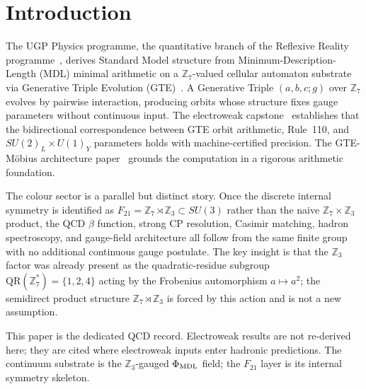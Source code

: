 \documentclass[11pt]{article}
\theoremstyle{remark}
\newcommand{\ZS}{\mathbb{Z}_7}
\newcommand{\ZZ}{\mathbb{Z}}
\newcommand{\phimdl}{\Phi_{\rm MDL}}
\newcommand{\Ftwentyone}{F_{21}}
\begin{document}
\section{Introduction}
\label{sec:intro}

The UGP Physics programme, the quantitative branch of the Reflexive Reality programme~\cite{SpivackResearchProgrammes}, derives Standard Model
structure from Minimum-Description-Length (MDL) minimal arithmetic on a $\ZS$-valued cellular automaton
substrate via Generative Triple Evolution (GTE)~\cite{SpivackCompUniversality}.
A Generative Triple $(a,b,c;g)$ over $\ZZ_7$ evolves by pairwise interaction,
producing orbits whose structure fixes gauge parameters without continuous input.
The electroweak capstone~\cite{SpivackGTEUnification} establishes that the
bidirectional correspondence between GTE orbit arithmetic, Rule~110, and
$SU(2)_L \times U(1)_Y$ parameters holds with machine-certified precision.
The GTE-Möbius architecture paper~\cite{SpivackGTEMobius} grounds the computation in
a rigorous arithmetic foundation.

The colour sector is a parallel but distinct story.
Once the discrete internal symmetry is identified as
$\Ftwentyone = \ZS \rtimes \ZZ_3 \subset SU(3)$ rather than the naive
$\ZS \times \ZZ_3$ product, the QCD $\beta$ function, strong CP resolution,
Casimir matching, hadron spectroscopy, and gauge-field architecture all follow
from the same finite group with no additional continuous gauge postulate.
The key insight is that the $\ZZ_3$ factor was already present as the
quadratic-residue subgroup $\mathrm{QR}(\ZS^*) = \{1,2,4\}$ acting by the
Frobenius automorphism $a \mapsto a^2$; the semidirect product structure
$\ZS \rtimes \ZZ_3$ is forced by this action and is not a new assumption.

This paper is the dedicated QCD record.
Electroweak results are not re-derived here; they are cited
where electroweak inputs enter hadronic predictions.
The continuum substrate is the $\ZZ_3$-gauged $\phimdl$ field; the
$\Ftwentyone$ layer is its internal symmetry skeleton.
\end{document}
